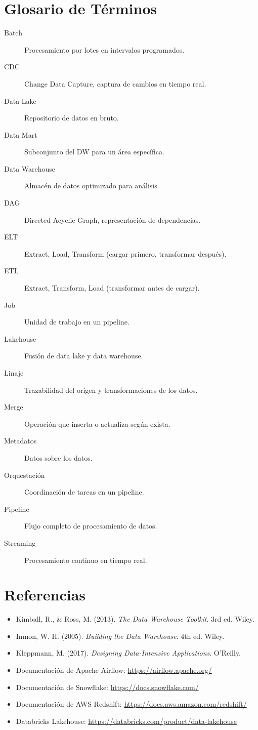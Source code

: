 \documentclass[12pt,a4paper,openany,oneside]{book}
\begin{document}
\chapter{Glosario de Términos}
\begin{description}
    \item[Batch] Procesamiento por lotes en intervalos programados.
    \item[CDC] Change Data Capture, captura de cambios en tiempo real.
    \item[Data Lake] Repositorio de datos en bruto.
    \item[Data Mart] Subconjunto del DW para un área específica.
    \item[Data Warehouse] Almacén de datos optimizado para análisis.
    \item[DAG] Directed Acyclic Graph, representación de dependencias.
    \item[ELT] Extract, Load, Transform (cargar primero, transformar después).
    \item[ETL] Extract, Transform, Load (transformar antes de cargar).
    \item[Job] Unidad de trabajo en un pipeline.
    \item[Lakehouse] Fusión de data lake y data warehouse.
    \item[Linaje] Trazabilidad del origen y transformaciones de los datos.
    \item[Merge] Operación que inserta o actualiza según exista.
    \item[Metadatos] Datos sobre los datos.
    \item[Orquestación] Coordinación de tareas en un pipeline.
    \item[Pipeline] Flujo completo de procesamiento de datos.
    \item[Streaming] Procesamiento continuo en tiempo real.
\end{description}

\chapter*{Referencias}
\begin{itemize}
    \item Kimball, R., \& Ross, M. (2013). \textit{The Data Warehouse Toolkit}. 3rd ed. Wiley.
    \item Inmon, W. H. (2005). \textit{Building the Data Warehouse}. 4th ed. Wiley.
    \item Kleppmann, M. (2017). \textit{Designing Data-Intensive Applications}. O'Reilly.
    \item Documentación de Apache Airflow: \url{https://airflow.apache.org/}
    \item Documentación de Snowflake: \url{https://docs.snowflake.com/}
    \item Documentación de AWS Redshift: \url{https://docs.aws.amazon.com/redshift/}
    \item Databricks Lakehouse: \url{https://databricks.com/product/data-lakehouse}
\end{itemize}
\end{document}
